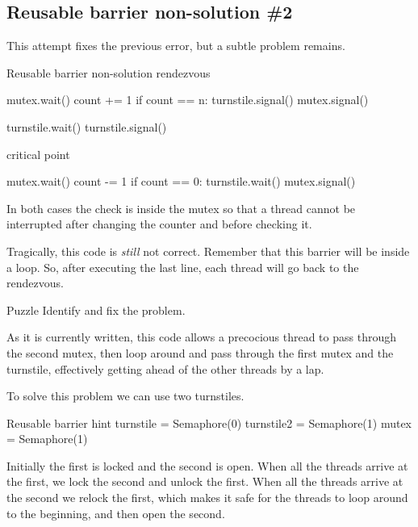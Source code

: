 \subsection*{Reusable barrier non-solution \#2}

This attempt fixes the previous error, but a subtle problem
remains.

\begin{lstbox}{Reusable barrier non-solution}
rendezvous

mutex.wait()
    count += 1
    if count == n: turnstile.signal()
mutex.signal()

turnstile.wait()
turnstile.signal()

critical point

mutex.wait()
    count -= 1
    if count == 0: turnstile.wait()
mutex.signal()
\end{lstbox}

In both cases the check is inside the mutex so that
a thread cannot be interrupted after changing the counter
and before checking it.

Tragically, this code is {\em still} not correct.
Remember that this barrier will be inside a loop.  So, after
executing the last line, each thread will go back
to the rendezvous.

\begin{puzzlebox}{Puzzle}
Identify and fix the problem.



As it is currently written, this code
allows a precocious thread to pass through the second mutex,
then loop around and pass through the first mutex and the
turnstile, effectively getting ahead of the other threads by
a lap.

To solve this problem we can use two turnstiles.

\begin{lstbox}{Reusable barrier hint}
turnstile = Semaphore(0)
turnstile2 = Semaphore(1)
mutex = Semaphore(1)
\end{lstbox}

Initially the first is locked and the second is open.  When all the
threads arrive at the first, we lock the second and unlock the first.
When all the threads arrive at the second we relock the first,
which makes it safe for the threads to loop around to the beginning,
and then open the second.
\end{puzzlebox}



